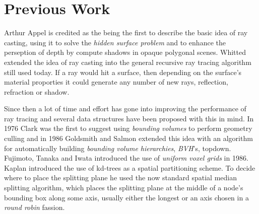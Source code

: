




\chapter{Previous Work}



Arthur Appel is credited as the being the first to describe the basic
idea of ray casting, using it to solve the
\textit{hidden surface problem} and to enhance the perseption of depth
by compute shadows in opaque polygonal scenes. Whitted extended the
idea of ray casting into the general recursive ray tracing algorithm
still used today. If a ray would hit a surface,
then depending on the surface's material proporties it could generate
any number of new rays, reflection, refraction or shadow.



Since then a lot of time and effort has gone into improving the
performance of ray tracing and several data structures have been
proposed with this in mind. In 1976 Clark was the first to suggest
using \textit{bounding volumes} to perform geometry culling and in
1986 Goldsmith and Salmon extended this idea with an algorithm for
automatically building \textit{bounding volume hierarchies},
\textit{BVH}'s, topdown. Fujimoto, Tanaka and
Iwata introduced the use of \textit{uniform voxel grids} in
1986. Kaplan introduced the use of kd-trees as
a spatial partitioning scheme. To decide where
to place the splitting plane he used the now standard spatial median
splitting algorithm, which places the splitting plane at the middle of
a node's bounding box along some axis, usually either the longest or
an axis chosen in a \textit{round robin} fassion.


